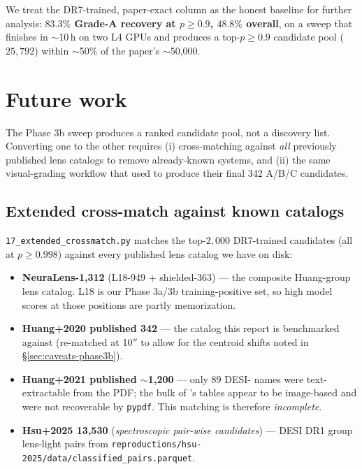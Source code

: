 \documentclass[11pt,letterpaper]{article}
\begin{document}
We treat the DR7-trained, paper-exact column as the honest baseline
for further analysis: \textbf{$83.3\%$ Grade-A recovery at
$p \geq 0.9$, $48.8\%$ overall}, on a sweep that finishes in
$\sim$10\,h on two L4 GPUs and produces a top-$p \geq 0.9$ candidate
pool ($25{,}792$) within $\sim$50\% of the paper's $\sim$50{,}000.

\section{Future work}
\label{sec:future-work}

The Phase 3b sweep produces a ranked candidate pool, not a discovery
list. Converting one to the other requires (i) cross-matching against
\emph{all} previously published lens catalogs to remove already-known
systems, and (ii) the same visual-grading workflow that
\textcite{huang2020decals} used to produce their final 342 A/B/C
candidates.

\subsection{Extended cross-match against known catalogs}

\texttt{17\_extended\_crossmatch.py} matches the top-$2{,}000$
DR7-trained candidates (all at $p \geq 0.998$) against every published
lens catalog we have on disk:

\begin{itemize}
\item \textbf{NeuraLens-1{,}312} (L18-949 + shielded-363) — the
      composite Huang-group lens catalog. L18 is our Phase 3a/3b
      training-positive set, so high model scores at those positions
      are partly memorization.
\item \textbf{Huang+2020 published 342} — the catalog this report is
      benchmarked against (re-matched at 10$''$ to allow for the
      centroid shifts noted in \S\ref{sec:caveats-phase3b}).
\item \textbf{Huang+2021 published $\sim$1{,}200} — only $89$ DESI-
      names were text-extractable from the PDF; the bulk of
      \textcite{huang2021desi}'s tables appear to be image-based and
      were not recoverable by \texttt{pypdf}. This matching is therefore
      \emph{incomplete}.
\item \textbf{Hsu+2025 13{,}530} (\textit{spectroscopic pair-wise
      candidates}) — DESI DR1 group lens-light pairs from
      \texttt{reproductions/hsu-2025/data/classified\_pairs.parquet}.
\end{itemize}
\end{document}
